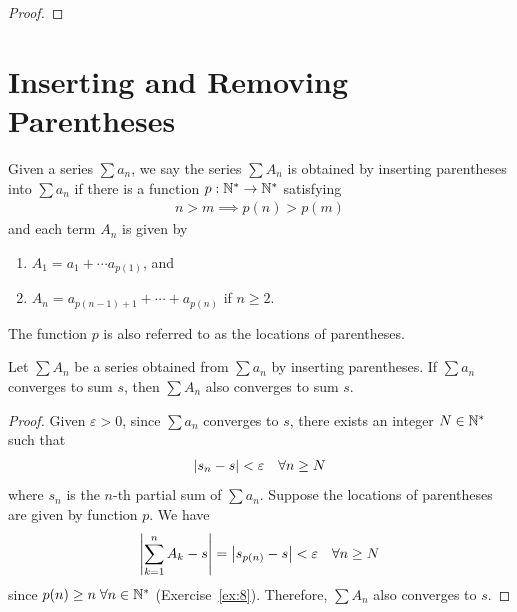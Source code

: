 \documentclass[thmcnt=section, 12pt]{my-elegantbook}
\begin{document}
\begin{proof}
\end{proof}


\section{Inserting and Removing Parentheses}


\begin{definition}
    Given a series $\sum a_n$, we say the series  $\sum A_n$ is obtained 
	by inserting parentheses into  $\sum a_n$
	if there is a function $p: \mathbb{N}^\ast \to \mathbb{N}^\ast$ satisfying 
	 \begin{align*}
	    n > m \implies p(n) > p(m)
	\end{align*}
	and each term $A_n$ is given by 
	 \begin{enumerate}
		 \item $A_1 = a_1 + \cdots a_{p(1)}$, and
		 \item  $A_n = a_{p(n-1)+1} + \cdots + a_{p(n)}$ if $n \geq 2$.
	\end{enumerate}
	The function $p$ is also referred to as the locations of parentheses.
\end{definition}

\begin{theorem}
	Let $\sum A_n$ be a series obtained from $\sum a_n$ 
	by inserting parentheses. 
	If $\sum a_n$ converges to sum $s$,
	then $\sum A_n$ also converges to sum $s$.
\end{theorem}

\begin{proof}
    Given $\varepsilon > 0$, since $\sum a_n$ converges to $s$, 
	there exists an integer $N \in \mathbb{N}^\ast$ such that 
	\begin{align*}
	\left\lvert s_n - s \right\rvert < \varepsilon 
	\quad \forall n \geq N
	\end{align*}
	where $s_n$ is the  $n$-th partial sum of $\sum a_n$.
	Suppose the locations of parentheses are given by function $p$.
	We have 
	\begin{align*}
		\left\lvert \sum_{k=1}^n A_k - s \right\rvert
		= \left\lvert s_{p(n)} - s \right\rvert
		< \varepsilon 
		\quad \forall n \geq N 
	\end{align*}
	since $p(n) \geq n \; \forall n \in \mathbb{N}^\ast$ (Exercise~\ref{ex:8}).
	Therefore, $\sum A_n$ also converges to $s$.
\end{proof}
\end{document}
